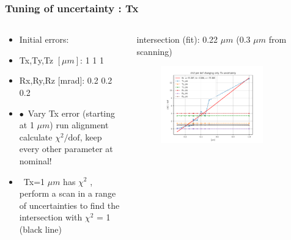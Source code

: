 \documentclass[aspectratio=1610, 12pt]{beamer}
\begin{document}
\begin{frame}\frametitle{Tuning of uncertainty : Tx}
  \begin{columns}
    \begin{column}[c]{0.4\textwidth}
      \begin{itemize}
        \item Initial errors:
        \item Tx,Ty,Tz $[\mu m]$: 1 1 1
        \item Rx,Ry,Rz [mrad]: 0.2 0.2 0.2
        \item $\bullet$\, Vary Tx error (starting at 1 $\mu m$) \to run alignment \to calculate $\chi^2 / \text{dof}$, keep every other parameter at nominal!
        \item \to\, Tx=1 $\mu m$ has $\chi^2$ , perform a scan in a range of uncertainties to find the intersection with $\chi^2$ = 1 (black line)
      \end{itemize}
    \end{column}
    \begin{column}[c]{0.6\textwidth}
      intersection (fit): 0.22 $\mu m$ (0.3 $\mu m$ from scanning)
      \begin{figure}
        \includegraphics[width=0.8\textwidth]{plots/retest/only_Tx_full_fit.pdf}
      \end{figure}
    \end{column}
  \end{columns}
\end{frame}
\end{document}
